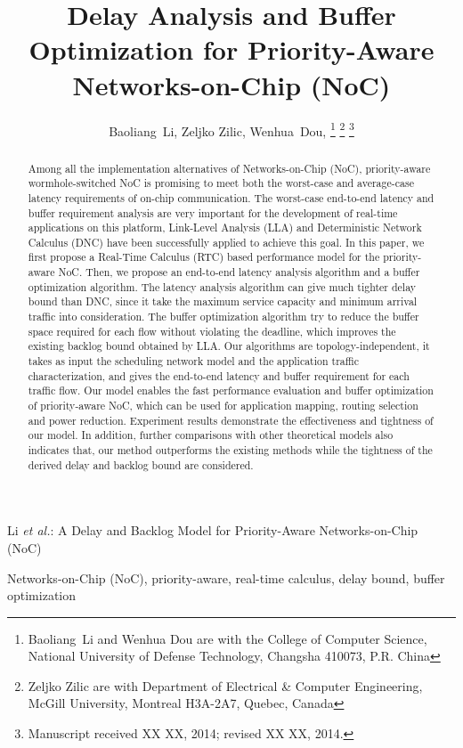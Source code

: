 \documentclass[10pt,journal]{IEEEtran}
\begin{document}
\title{Delay Analysis and Buffer Optimization for Priority-Aware Networks-on-Chip (NoC)}

\author{Baoliang~Li, %
        Zeljko Zilic, %
        Wenhua~Dou, %
\thanks{Baoliang~Li and Wenhua Dou are with the College of Computer Science, National University of Defense Technology, Changsha 410073, P.R. China}%
\thanks{Zeljko Zilic are with Department of Electrical \& Computer Engineering, McGill University, Montreal H3A-2A7, Quebec, Canada}%
\thanks{Manuscript received XX XX, 2014; revised XX XX, 2014.}}

%
{Li \MakeLowercase{\textit{et al.}}: A Delay and Backlog Model for Priority-Aware Networks-on-Chip (NoC)}

\maketitle

\begin{abstract}
Among all the implementation alternatives of Networks-on-Chip (NoC), priority-aware wormhole-switched NoC is promising to meet both the worst-case and average-case latency requirements of on-chip communication. The worst-case end-to-end latency and buffer requirement analysis are very important for the development of real-time applications on this platform, Link-Level Analysis (LLA) and Deterministic Network Calculus (DNC) have been successfully applied to achieve this goal. In this paper, we first propose a Real-Time Calculus (RTC) based performance model for the priority-aware NoC. Then, we propose an end-to-end latency analysis algorithm and a buffer optimization algorithm. The latency analysis algorithm can give much tighter delay bound than DNC, since it take the maximum service capacity and minimum arrival traffic into consideration. The buffer optimization algorithm try to reduce the buffer space required for each flow without violating the deadline, which improves the existing backlog bound obtained by LLA. Our algorithms are topology-independent, it takes as input the scheduling network model and the application traffic characterization, and gives the end-to-end latency and buffer requirement for each traffic flow. Our model enables the fast performance evaluation and buffer optimization of priority-aware NoC, which can be used for application mapping, routing selection and power reduction. Experiment results demonstrate the effectiveness and tightness of our model. In addition, further comparisons with other theoretical models also indicates that, our method outperforms the existing methods while the tightness of the derived delay and backlog bound are considered.
\end{abstract}
\begin{IEEEkeywords}
Networks-on-Chip (NoC), priority-aware, real-time calculus, delay bound, buffer optimization
\end{IEEEkeywords}
\end{document}
